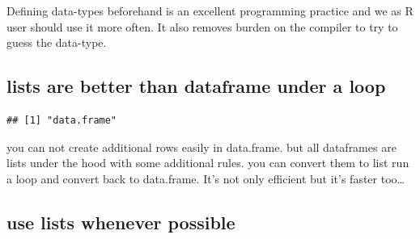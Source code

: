 \documentclass[
]{book}
\newenvironment{Shaded}{\begin{snugshade}}{\end{snugshade}}
\newcommand{\AttributeTok}[1]{\textcolor[rgb]{0.77,0.63,0.00}{#1}}
\newcommand{\CommentTok}[1]{\textcolor[rgb]{0.56,0.35,0.01}{\textit{#1}}}
\newcommand{\ControlFlowTok}[1]{\textcolor[rgb]{0.13,0.29,0.53}{\textbf{#1}}}
\newcommand{\DecValTok}[1]{\textcolor[rgb]{0.00,0.00,0.81}{#1}}
\newcommand{\FloatTok}[1]{\textcolor[rgb]{0.00,0.00,0.81}{#1}}
\newcommand{\FunctionTok}[1]{\textcolor[rgb]{0.00,0.00,0.00}{#1}}
\newcommand{\NormalTok}[1]{#1}
\newcommand{\OtherTok}[1]{\textcolor[rgb]{0.56,0.35,0.01}{#1}}
\newcommand{\SpecialCharTok}[1]{\textcolor[rgb]{0.00,0.00,0.00}{#1}}
\begin{document}
Defining data-types beforehand is an excellent programming practice and we as R user should use it more often. It also removes burden on the compiler to try to guess the data-type.

\hypertarget{lists-are-better-than-dataframe-under-a-loop}{%
\subsection{lists are better than dataframe under a loop}\label{lists-are-better-than-dataframe-under-a-loop}}

\begin{Shaded}
\end{Shaded}

\begin{verbatim}
## [1] "data.frame"
\end{verbatim}

you can not create additional rows easily in data.frame. but all dataframes are lists under the hood with some additional rules. you can convert them to list run a loop and convert back to data.frame. It's not only efficient but it's faster too\ldots{}

\hypertarget{use-lists-whenever-possible}{%
\subsection{use lists whenever possible}\label{use-lists-whenever-possible}}
\end{document}
